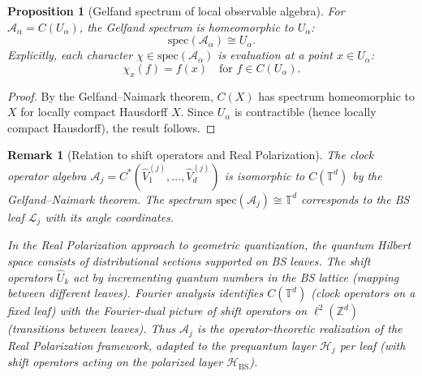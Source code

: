 \documentclass[11pt]{article}
\newtheorem{proposition}[theorem]{Proposition}
\newtheorem{remark}[theorem]{Remark}
\begin{document}
\begin{proposition}[Gelfand spectrum of local observable algebra]
\label{prop:gelfand}
For $\mathcal{A}_\alpha = C(U_\alpha)$, the Gelfand
spectrum is homeomorphic to $U_\alpha$:
\[
  \mathrm{spec}(\mathcal{A}_\alpha) \cong U_\alpha.
\]
Explicitly, each character $\chi \in \mathrm{spec}(\mathcal{A}_\alpha)$
is evaluation at a point $x \in U_\alpha$:
\[
  \chi_x(f) = f(x) \quad \text{for } f \in C(U_\alpha).
\]
\end{proposition}

\begin{proof}
By the Gelfand--Naimark theorem, $C(X)$ has spectrum homeomorphic to $X$
for locally compact Hausdorff $X$. Since $U_\alpha$ is contractible
(hence locally compact Hausdorff), the result follows.
\end{proof}

\begin{remark}[Relation to shift operators and Real Polarization]
\label{rem:shift-dual}
The clock operator algebra $\mathcal{A}_j = C^*(\hat{V}_1^{(j)}, \dots, \hat{V}_d^{(j)})$
is isomorphic to $C(\mathbb{T}^d)$ by the Gelfand--Naimark theorem.
The spectrum $\mathrm{spec}(\mathcal{A}_j) \cong \mathbb{T}^d$ corresponds
to the BS leaf $\mathcal{L}_j$ with its angle coordinates.

In the Real Polarization approach to geometric quantization,
the quantum Hilbert space consists of distributional sections
supported on BS leaves. The \emph{shift operators} $\hat{U}_k$ act
by incrementing quantum numbers in the BS lattice (mapping between
different leaves). Fourier analysis identifies $C(\mathbb{T}^d)$
(clock operators on a fixed leaf) with the Fourier-dual picture of
shift operators on $\ell^2(\mathbb{Z}^d)$ (transitions between leaves).
Thus $\mathcal{A}_j$ is the operator-theoretic realization of the
Real Polarization framework, adapted to the prequantum layer $\mathcal{H}_j$
per leaf (with shift operators acting on the polarized layer $\mathcal{H}_{\mathrm{BS}}$).
\end{remark}
\end{document}
